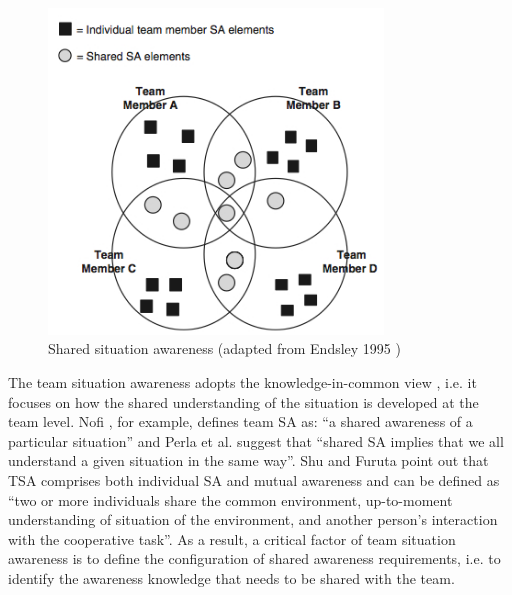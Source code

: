 \begin{figure}[htbp] %
   \centering
   \includegraphics[width=3.5in]{TSA.jpg} 
   \caption{Shared situation awareness (adapted from Endsley 1995 \cite{Endsley1995})}
   \label{fig:tsa}
\end{figure}

The team situation awareness adopts the knowledge-in-common view \cite{Mohammed2001}, i.e. it focuses on how the shared understanding of the situation is developed at the team level. Nofi \cite{nofi2000defining}, for example, defines team SA as: ``a shared awareness of a particular situation'' and Perla et al. \cite{perla2000gaming} suggest that ``shared SA implies that we all understand a given situation in the same way''. Shu and Furuta \cite{shu2005inference} point out that TSA comprises both individual SA and mutual awareness and can be defined as ``two or more individuals share the common environment, up-to-moment understanding of situation of the environment, and another person's interaction with the cooperative task''. As a result, a critical factor of team situation awareness is to define the configuration of shared awareness requirements, i.e. to identify the awareness knowledge that needs to be shared with the team.

